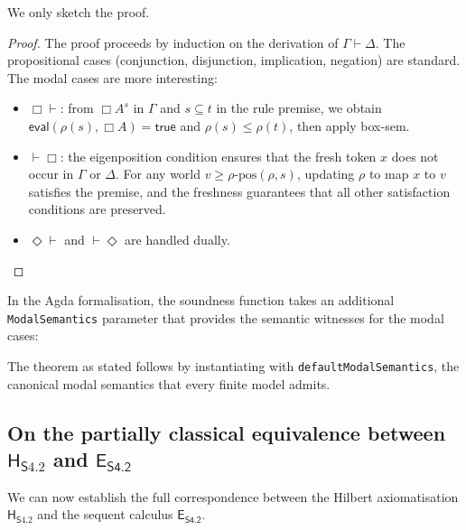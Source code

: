 \documentclass{article}
\newcommand{\seq}[2]{{#1} \vdash{} {#2}}
\newcommand{\pf}[2]{{#1}^{#2}} %
\newcommand{\logic}{\mathsf{S4.2}}
\newcommand{\eseq}{\mathsf{E}_{{\textsf{S4.2}}}}
\newcommand{\agda}{\textsf{Agda}}
\newcommand{\hilbertlogic}[1]{\mathsf{H}_{#1}}
\theoremstyle{definition}
\begin{document}
We only sketch the proof.
\begin{proof}
The proof proceeds by induction on the derivation of $\seq{\Gamma}{\Delta}$. The propositional cases (conjunction, disjunction, implication, negation) are standard. The modal cases are more interesting:
\begin{itemize}
\item $\Box\vdash$: from $\pf{\Box A}{s}$ in $\Gamma$ and $s \subseteq t$ in the rule premise, we obtain $\mathsf{eval}(\rho(s), \Box A) = \mathsf{true}$ and $\rho(s) \leq \rho(t)$, then apply \textsf{box-sem}.

\item $\vdash\Box$: the eigenposition condition ensures that the fresh token $x$ does not occur in $\Gamma$ or $\Delta$. For any world $v \geq \rho\text{-pos}(\rho, s)$, updating $\rho$ to map $x$ to $v$ satisfies the premise, and the freshness guarantees that all other satisfaction conditions are preserved.

\item $\Diamond\vdash$ and $\vdash\Diamond$ are handled dually.
\end{itemize}

\end{proof}

\noindent
In the \agda{} formalisation, the soundness function takes an additional \texttt{ModalSemantics} parameter that provides the semantic witnesses for the modal cases:

\begingroup\footnotesize
{}
\endgroup

\noindent
The theorem as stated follows by instantiating with \texttt{defaultModalSemantics}, the canonical modal semantics that every finite model admits.

\bigskip


\subsection{ On the partially classical equivalence between $\hilbertlogic{\logic}$ and $\eseq$ }\label{ssec:hilbert-equiv}

We can now establish the full correspondence between the Hilbert axiomatisation $\hilbertlogic{\logic}$ and the sequent calculus $\eseq$.
\end{document}
